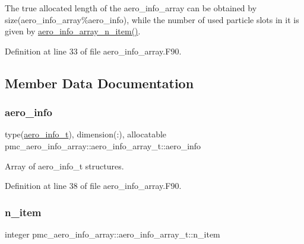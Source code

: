 The true allocated length of the aero\+\_\+info\+\_\+array can be obtained by size(aero\+\_\+info\+\_\+array\%aero\+\_\+info), while the number of used particle slots in it is given by \mbox{\hyperlink{namespacepmc__aero__info__array_a0704e78a0bc96744d181384d88dff2ee}{aero\+\_\+info\+\_\+array\+\_\+n\+\_\+item()}}. 

Definition at line 33 of file aero\+\_\+info\+\_\+array.\+F90.



\subsection{Member Data Documentation}
\mbox{\label{structpmc__aero__info__array_1_1aero__info__array__t_a53c9429809f4d472083294d758a2852e}} 
\subsubsection{\texorpdfstring{aero\+\_\+info}{aero\_info}}
{\footnotesize\ttfamily type(\mbox{\hyperlink{structpmc__aero__info_1_1aero__info__t}{aero\+\_\+info\+\_\+t}}), dimension(\+:), allocatable pmc\+\_\+aero\+\_\+info\+\_\+array\+::aero\+\_\+info\+\_\+array\+\_\+t\+::aero\+\_\+info}



Array of aero\+\_\+info\+\_\+t structures. 



Definition at line 38 of file aero\+\_\+info\+\_\+array.\+F90.

\mbox{\label{structpmc__aero__info__array_1_1aero__info__array__t_af686e922a026366c7c9eb9ed3bfc85ac}} 
\subsubsection{\texorpdfstring{n\+\_\+item}{n\_item}}
{\footnotesize\ttfamily integer pmc\+\_\+aero\+\_\+info\+\_\+array\+::aero\+\_\+info\+\_\+array\+\_\+t\+::n\+\_\+item}



